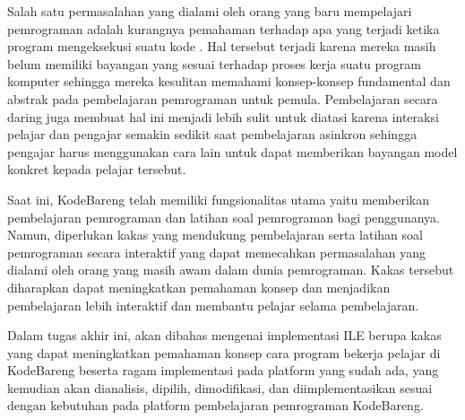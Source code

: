 Salah satu permasalahan yang dialami oleh orang yang baru mempelajari pemrograman adalah kurangnya pemahaman terhadap apa yang terjadi ketika program mengeksekusi suatu kode \parencite{mayer1981psychology, moons2013pilot}. Hal tersebut terjadi karena mereka masih belum memiliki bayangan yang sesuai terhadap proses kerja suatu program komputer sehingga mereka kesulitan memahami konsep-konsep fundamental dan abstrak pada pembelajaran pemrograman untuk pemula. Pembelajaran secara daring juga membuat hal ini menjadi lebih sulit untuk diatasi karena interaksi pelajar dan pengajar semakin sedikit saat pembelajaran asinkron sehingga pengajar harus menggunakan cara lain untuk dapat memberikan bayangan model konkret kepada pelajar tersebut.

Saat ini, KodeBareng telah memiliki fungsionalitas utama yaitu memberikan pembelajaran pemrograman dan latihan soal pemrograman bagi penggunanya. Namun, diperlukan kakas yang mendukung pembelajaran serta latihan soal pemrograman secara interaktif yang dapat memecahkan permasalahan yang dialami oleh orang yang masih awam dalam dunia pemrograman. Kakas tersebut diharapkan dapat meningkatkan pemahaman konsep dan menjadikan pembelajaran lebih interaktif dan membantu pelajar selama pembelajaran.


Dalam tugas akhir ini, akan dibahas mengenai implementasi ILE berupa kakas yang dapat meningkatkan pemahaman konsep cara program bekerja pelajar di KodeBareng beserta ragam implementasi pada platform yang sudah ada, yang kemudian akan dianalisis, dipilih, dimodifikasi, dan diimplementasikan sesuai dengan kebutuhan pada platform pembelajaran pemrograman KodeBareng.


